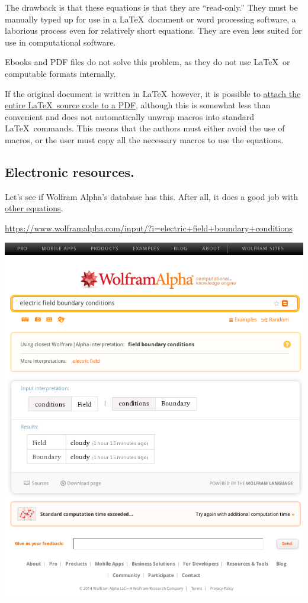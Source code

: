 \documentclass[12pt,letterpaper]{article}
\begin{document}
The drawback is that these equations is that they are ``read-only.''
They must be manually typed up for use in a \LaTeX\ document or word processing software,
a laborious process even for relatively short equations.
They are even less suited for use in computational software.

Ebooks and PDF files do not solve this problem,
as they do not use \LaTeX\ or computable formats internally.

If the original document is written in \LaTeX\, however,
it is possible to
\href{http://www.ctan.org/pkg/embedfile}
{attach the entire \LaTeX\ source code to a PDF},
although this is somewhat less than convenient
and does not automatically unwrap macros into standard \LaTeX\ commands.
This means that the authors must either avoid the use of macros,
or the user must copy all the necessary macros to use the equations.

\subsection{Electronic resources.}

Let's see if Wolfram Alpha's database has this.
After all,
it does a good job with
\href{https://www.wolframalpha.com/input/?i=particle+in+a+magnetic+field}
{other equations}.

\url{https://www.wolframalpha.com/input/?i=electric+field+boundary+conditions}

\begin{center}
\includegraphics[scale=0.7]{wolfram-alpha-electric-field-boundary-conditions.png}
\end{center}
\end{document}

